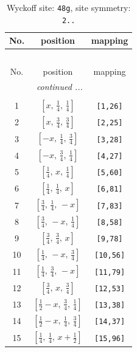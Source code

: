 \documentclass[fleqn,8pt]{jsarticle}
\begin{document}
\begin{longtable}{ccc}
\caption{Wyckoff site: {\tt 48g}, site symmetry: {\tt 2..}}
 \\
 \hline \hline
No. & position & mapping \\ \hline \endfirsthead

\multicolumn{2}{l}{\tablename\ \thetable{}} \\
 \hline \hline
No. & position & mapping \\ \hline \endhead

 \hline \hline
\multicolumn{2}{r}{\footnotesize\it continued ...} \\ \endfoot

 \hline \hline
\multicolumn{2}{r}{} \\ \endlastfoot

1 & $\left[ x,\, \frac{1}{4},\, \frac{1}{4} \right]$ & {\tt [1,26]} \\ \hline
2 & $\left[ x,\, \frac{3}{4},\, \frac{3}{4} \right]$ & {\tt [2,25]} \\ \hline
3 & $\left[ - x,\, \frac{1}{4},\, \frac{3}{4} \right]$ & {\tt [3,28]} \\ \hline
4 & $\left[ - x,\, \frac{3}{4},\, \frac{1}{4} \right]$ & {\tt [4,27]} \\ \hline
5 & $\left[ \frac{1}{4},\, x,\, \frac{1}{4} \right]$ & {\tt [5,60]} \\ \hline
6 & $\left[ \frac{1}{4},\, \frac{1}{4},\, x \right]$ & {\tt [6,81]} \\ \hline
7 & $\left[ \frac{3}{4},\, \frac{1}{4},\, - x \right]$ & {\tt [7,83]} \\ \hline
8 & $\left[ \frac{3}{4},\, - x,\, \frac{1}{4} \right]$ & {\tt [8,58]} \\ \hline
9 & $\left[ \frac{3}{4},\, \frac{3}{4},\, x \right]$ & {\tt [9,78]} \\ \hline
10 & $\left[ \frac{1}{4},\, - x,\, \frac{3}{4} \right]$ & {\tt [10,56]} \\ \hline
11 & $\left[ \frac{1}{4},\, \frac{3}{4},\, - x \right]$ & {\tt [11,79]} \\ \hline
12 & $\left[ \frac{3}{4},\, x,\, \frac{3}{4} \right]$ & {\tt [12,53]} \\ \hline
13 & $\left[ \frac{1}{2} - x,\, \frac{3}{4},\, \frac{1}{4} \right]$ & {\tt [13,38]} \\ \hline
14 & $\left[ \frac{1}{2} - x,\, \frac{1}{4},\, \frac{3}{4} \right]$ & {\tt [14,37]} \\ \hline
15 & $\left[ \frac{1}{4},\, \frac{1}{4},\, x + \frac{1}{2} \right]$ & {\tt [15,96]} \\ \hline

\end{longtable}
\end{document}
